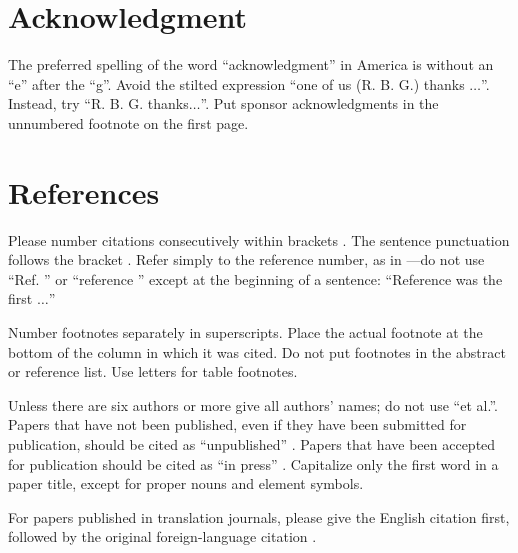 \documentclass[conference]{IEEEtran}
\begin{document}
\section*{Acknowledgment}

The preferred spelling of the word ``acknowledgment'' in America is without 
an ``e'' after the ``g''. Avoid the stilted expression ``one of us (R. B. 
G.) thanks $\ldots$''. Instead, try ``R. B. G. thanks$\ldots$''. Put sponsor 
acknowledgments in the unnumbered footnote on the first page.

\section*{References}

Please number citations consecutively within brackets . The 
sentence punctuation follows the bracket . Refer simply to the reference 
number, as in ---do not use ``Ref. '' or ``reference '' except at 
the beginning of a sentence: ``Reference  was the first $\ldots$''

Number footnotes separately in superscripts. Place the actual footnote at 
the bottom of the column in which it was cited. Do not put footnotes in the 
abstract or reference list. Use letters for table footnotes.

Unless there are six authors or more give all authors' names; do not use 
``et al.''. Papers that have not been published, even if they have been 
submitted for publication, should be cited as ``unpublished'' . Papers 
that have been accepted for publication should be cited as ``in press'' . 
Capitalize only the first word in a paper title, except for proper nouns and 
element symbols.

For papers published in translation journals, please give the English 
citation first, followed by the original foreign-language citation .\cite{iyerColdChainOptimisation2025}




\end{document}
